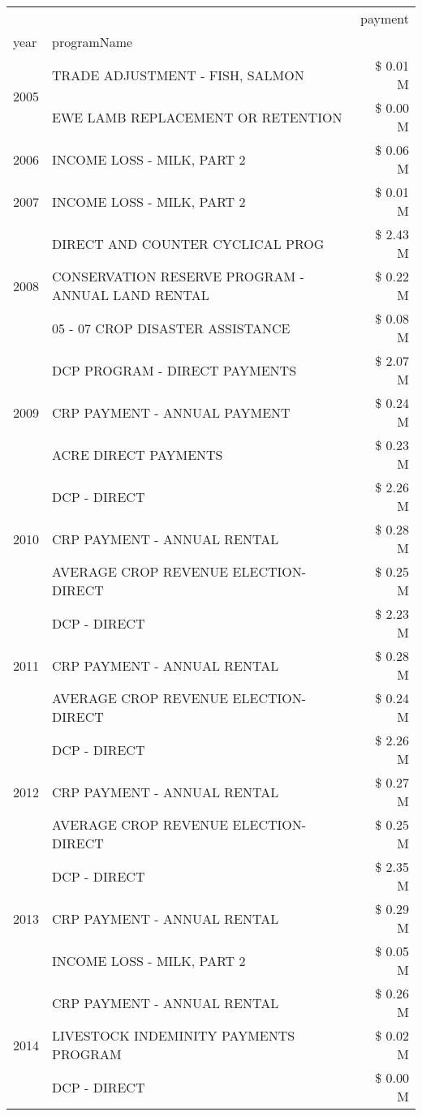 \begin{tabular}{llr}
\toprule
 &  & payment \\
year & programName &  \\
\midrule
\multirow[t]{2}{*}{2005} & TRADE ADJUSTMENT - FISH, SALMON & \$ 0.01 M \\
 & EWE LAMB REPLACEMENT OR RETENTION & \$ 0.00 M \\
\cline{1-3}
2006 & INCOME LOSS - MILK, PART 2 & \$ 0.06 M \\
\cline{1-3}
2007 & INCOME LOSS - MILK, PART 2 & \$ 0.01 M \\
\cline{1-3}
\multirow[t]{3}{*}{2008} & DIRECT AND COUNTER CYCLICAL PROG & \$ 2.43 M \\
 & CONSERVATION RESERVE PROGRAM - ANNUAL LAND RENTAL & \$ 0.22 M \\
 & 05 - 07 CROP DISASTER ASSISTANCE & \$ 0.08 M \\
\cline{1-3}
\multirow[t]{3}{*}{2009} & DCP PROGRAM - DIRECT PAYMENTS & \$ 2.07 M \\
 & CRP PAYMENT - ANNUAL PAYMENT & \$ 0.24 M \\
 & ACRE DIRECT PAYMENTS & \$ 0.23 M \\
\cline{1-3}
\multirow[t]{3}{*}{2010} & DCP - DIRECT & \$ 2.26 M \\
 & CRP PAYMENT - ANNUAL RENTAL & \$ 0.28 M \\
 & AVERAGE CROP REVENUE ELECTION-DIRECT & \$ 0.25 M \\
\cline{1-3}
\multirow[t]{3}{*}{2011} & DCP - DIRECT & \$ 2.23 M \\
 & CRP PAYMENT - ANNUAL RENTAL & \$ 0.28 M \\
 & AVERAGE CROP REVENUE ELECTION-DIRECT & \$ 0.24 M \\
\cline{1-3}
\multirow[t]{3}{*}{2012} & DCP - DIRECT & \$ 2.26 M \\
 & CRP PAYMENT - ANNUAL RENTAL & \$ 0.27 M \\
 & AVERAGE CROP REVENUE ELECTION-DIRECT & \$ 0.25 M \\
\cline{1-3}
\multirow[t]{3}{*}{2013} & DCP - DIRECT & \$ 2.35 M \\
 & CRP PAYMENT - ANNUAL RENTAL & \$ 0.29 M \\
 & INCOME LOSS - MILK, PART 2 & \$ 0.05 M \\
\cline{1-3}
\multirow[t]{3}{*}{2014} & CRP PAYMENT - ANNUAL RENTAL & \$ 0.26 M \\
 & LIVESTOCK INDEMINITY PAYMENTS PROGRAM & \$ 0.02 M \\
 & DCP - DIRECT & \$ 0.00 M \\

\end{tabular}
